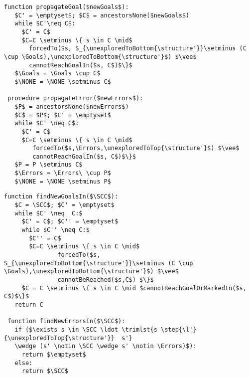 \lstset{numbers=none, numberstyle=\tiny, stepnumber=1, numbersep=5pt}
\begin{lstlisting}[language={pseudocode},label={lst:dcs.propagate},caption={Algoritmos de propagación.},float=ht, frame=single]
 function propagateGoal($newGoals$):
   $C' = \emptyset$; $C$ = ancestorsNone($newGoals$)
   while $C'\neq C$:
     $C' = C$
     $C=C \setminus \{ s \in C \mid$ 
       forcedTo($s, S_{\unexploredToBottom{\structure'}}\setminus (C \cup \Goals),\unexploredToBottom{\structure'}$) $\vee$
       cannotReachGoalIn($s, C$)$\}$
   $\Goals = \Goals \cup C$
   $\NONE = \NONE \setminus C$

 procedure propagateError($newErrors$):
   $P$ = ancestorsNone($newErrors$)
   $C$ = $P$; $C' = \emptyset$
   while $C' \neq C$:
     $C' = C$
     $C=C \setminus \{ s \in C \mid$ 
     	forcedTo($s,\Errors,\unexploredToTop{\structure'}$) $\vee$
     	cannotReachGoalIn($s, C$)$\}$
   $P = P \setminus C$
   $\Errors = \Errors\ \cup P$
   $\NONE = \NONE \setminus P$
\end{lstlisting}


\begin{lstlisting}[language={pseudocode},label={lst:dcs.gather},caption={Confirmación de clasificaciones},float=ht, frame=single]
 function findNewGoalsIn($\SCC$):
   $C = \SCC$; $C' = \emptyset$
   while $C' \neq  C:$
     $C' = C$; $C'' = \emptyset$
     while $C'' \neq C:$
       $C'' = C$
       $C=C \setminus \{ s \in C \mid$ 
               forcedTo($s, S_{\unexploredToBottom{\structure'}}\setminus (C \cup \Goals),\unexploredToBottom{\structure'}$) $\vee$
               cannotBeReached($s,C$) $\}$
     $C = C \setminus \{ s \in C \mid $cannotReachGoalOrMarkedIn($s, C$)$\}$
   return C
  
 function findNewErrorsIn($\SCC$):
   if ($\exists s \in \SCC \ldot \trimlst{s \step{\l'}{\unexploredToTop{\structure'}}  s'} 
   \wedge (s' \notin \SCC \wedge s' \notin \Errors)$):
     return $\emptyset$
   else: 
     return $\SCC$
\end{lstlisting}




